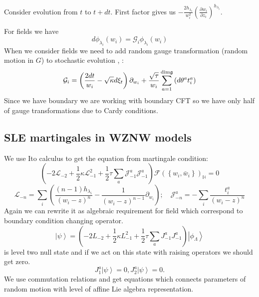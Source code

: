 Consider evolution from $t$ to $t+dt$.
First factor gives us $-\frac{2h_{\lambda_{i}}}{w_{i}^{2}}\left(\frac{\partial w_{i}}{\partial z_{i}}\right)^{h_{\lambda_{i}}}$.

 For fields we have
\begin{equation*}
  d\phi_{\lambda_{i}}(w_{i}) = \mathcal{G}_{i}\phi_{\lambda_{i}}(w_{i})
\end{equation*}
When we consider fields we need to add random gauge transformation (random motion in $G$) to stochastic evolution \cite{bettelheim2005stochastic}, \cite{alekseev2010sle}:
\begin{equation*}
  \mathcal{G}_{i}=\left(\frac{2dt}{w_{i}}-\sqrt{\kappa} d\xi_{t}\right) \partial_{w_{i}}+\frac{\sqrt{\tau}}{w_{i}}\sum_{a=1}^{\mathrm{dim} \mathfrak{g}}\left(d \theta ^{a} t^{a}_{i}\right)
\end{equation*}
Since we have boundary we are working with boundary CFT so we have only half of gauge transformations due to Cardy conditions.

\subsection{SLE martingales in WZNW models}
We use Ito calculus to get the equation from martingale condition:
\begin{equation*}
  \left(-2 \mathcal{L}_{-2}+\frac{1}{2}\kappa \mathcal{L}_{-1}^{2}+\frac{1}{2}\tau\sum_{a} \mathcal{J}^{a}_{-1} \mathcal{J}^{a}_{-1}\right)        \mathcal{F}(\left\{w_{i}, \bar w_{i}\right\})_{\mathbb{H}}=0
\end{equation*}
\begin{equation*}
  \mathcal{L}_{-n}=\sum_{i}\left(\frac{(n-1)h_{\lambda_{i}}}{(w_{i}-z)^{n}}-\frac{1}{(w_{i}-z)^{n-1}}\partial_{w_{i}}\right);\quad \mathcal{J}^{a}_{{-n}}=-\sum_{i}\frac{t^{a}_{i}}{(w_{i}-z)^{n}}
\end{equation*}
Again we can rewrite it as algebraic requirement for  field  which 
correspond to boundary condition changing operator.
\begin{equation*}
  \left| \psi\right>=\left(-2 L_{-2}+\frac{1}{2}\kappa L_{-1}^{2}+\frac{1}{2}\tau\sum_{a} J^{a}_{-1} J^{a}_{-1}\right) \left|\phi_{\Lambda}\right>    
\end{equation*}
is level two null state and if we act on this state with raising operators we should get zero.
\begin{equation*}
  J^{a}_{1} \left|\psi\right>=0, J^{a}_{2}\left|\psi\right>=0.
\end{equation*}
 We use commutation relations and get equations which connects parameters of random motion with level of affine Lie algebra representation. 

